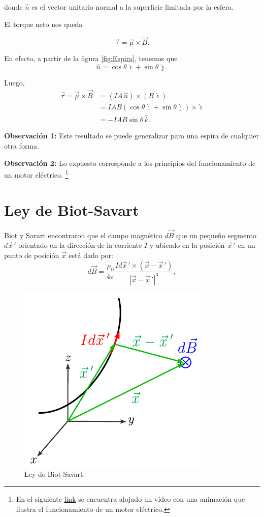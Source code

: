donde $\hat{n}$ es el vector unitario normal a la superficie limitada por la esfera.

El torque neto nos queda
\begin{shaded}
    $$\vec{\tau} = \vec{\mu} \times \vec{B}.$$
\end{shaded}

En efecto, a partir de la figura \ref{fig:Espira}, tenemos que
$$\hat{n} = \cos \theta \,\hat{\imath} + \sin\theta \,\hat{\jmath}.$$

Luego,
\begin{align*}
   \vec{\tau} = \vec{\mu} \times \vec{B} &= (IA \,\hat{n}) \times (B\,\hat{\imath}) \\
   &= IA B (\cos \theta \,\hat{\imath} + \sin  \theta \,\hat{\jmath}) \times \hat{\imath} \\
   &= - IAB \sin \theta\,\hat{k}.
\end{align*}

\textbf{Observación 1:} Este resultado se puede generalizar para una espira de cualquier otra forma.

\textbf{Observación 2:} Lo expuesto corresponde a los principios del funcionamiento de un motor eléctrico. \footnote{En el siguiente \href{https://youtu.be/24lasu4V8NI}{link} se encuentra alojado un vídeo con una animación que ilustra el funcionamiento de un motor eléctrico.}

\section{Ley de Biot-Savart}

Biot y Savart encontraron que el campo magnético $d\vec{B}$ que un pequeño segmento $d\vec{x}\,'$ orientado en la dirección de la corriente $I$ y ubicado en la posición $\vec{x}\,'$ en un punto de posición $\vec{x}$ está dado por:
$$d\vec{B} = \frac{\mu_0}{4\pi} \frac{I d\vec{x}\,' \times (\vec{x} - \vec{x}\,')}{|\vec{x} - \vec{x}\,'|^3},$$

\begin{figure}[H]
    \centering
    \includegraphics[scale = 1.2]{Figuras/Ley-Biot-Savart.pdf}
    \caption{Ley de Biot-Savart.}
    \label{fig:my_label}
\end{figure}

